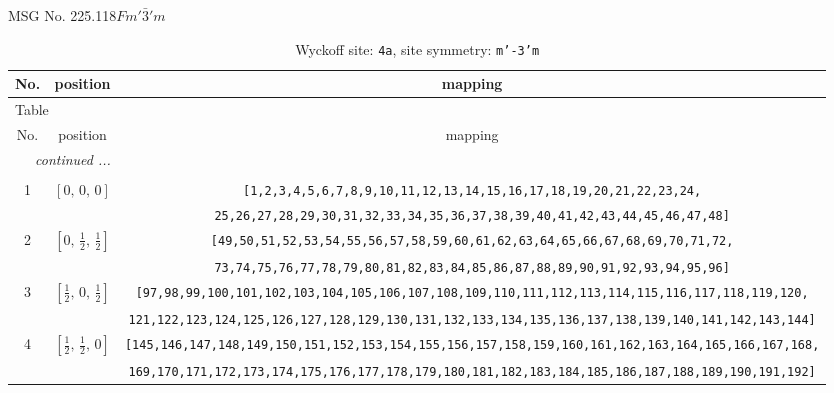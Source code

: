 \documentclass[fleqn,8pt]{jsarticle}
\begin{document}
\setcounter{MaxMatrixCols}{32}

\renewcommand{\tablename}{Table~}
\renewcommand{\figurename}{Figure~}
\begin{center}
\LARGE
MSG No. 225.118\quad$Fm'\bar{3}'m$
\end{center}
\renewcommand{\arraystretch}{1.2}
\begin{longtable}{ccc}
\caption{Wyckoff site: {\tt 4a}, site symmetry: {\tt m'-3'm}}
 \\
 \hline \hline
No. & position & mapping \\ \hline \endfirsthead

\multicolumn{2}{l}{\tablename\ \thetable{}} \\
 \hline \hline
No. & position & mapping \\ \hline \endhead

 \hline \hline
\multicolumn{2}{r}{\footnotesize\it continued ...} \\ \endfoot

 \hline \hline
\multicolumn{2}{r}{} \\ \endlastfoot

1 & $\left[ 0,\, 0,\, 0 \right]$ & {\tt [1,2,3,4,5,6,7,8,9,10,11,12,13,14,15,16,17,18,19,20,21,22,23,24,} \\ \hline
 &  & {\tt 25,26,27,28,29,30,31,32,33,34,35,36,37,38,39,40,41,42,43,44,45,46,47,48]} \\ \hline
2 & $\left[ 0,\, \frac{1}{2},\, \frac{1}{2} \right]$ & {\tt [49,50,51,52,53,54,55,56,57,58,59,60,61,62,63,64,65,66,67,68,69,70,71,72,} \\ \hline
 &  & {\tt 73,74,75,76,77,78,79,80,81,82,83,84,85,86,87,88,89,90,91,92,93,94,95,96]} \\ \hline
3 & $\left[ \frac{1}{2},\, 0,\, \frac{1}{2} \right]$ & {\tt [97,98,99,100,101,102,103,104,105,106,107,108,109,110,111,112,113,114,115,116,117,118,119,120,} \\ \hline
 &  & {\tt 121,122,123,124,125,126,127,128,129,130,131,132,133,134,135,136,137,138,139,140,141,142,143,144]} \\ \hline
4 & $\left[ \frac{1}{2},\, \frac{1}{2},\, 0 \right]$ & {\tt [145,146,147,148,149,150,151,152,153,154,155,156,157,158,159,160,161,162,163,164,165,166,167,168,} \\ \hline
 &  & {\tt 169,170,171,172,173,174,175,176,177,178,179,180,181,182,183,184,185,186,187,188,189,190,191,192]} \\
\end{longtable}
\renewcommand{\arraystretch}{1.2}
\end{document}
